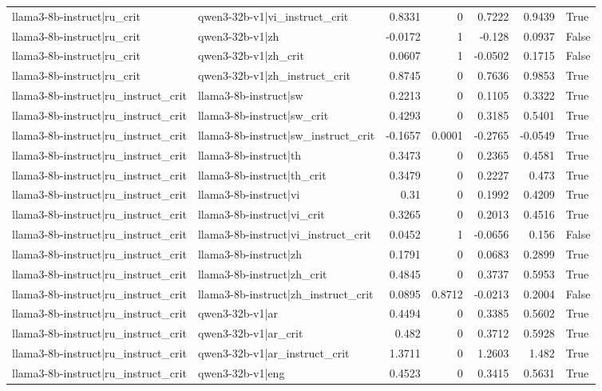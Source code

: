 \begin{table}
\begin{tabular}{l l r r r r l}
llama3-8b-instruct|ru_crit & qwen3-32b-v1|vi_instruct_crit & 0.8331 & 0 & 0.7222 & 0.9439 & True \\
llama3-8b-instruct|ru_crit & qwen3-32b-v1|zh & -0.0172 & 1 & -0.128 & 0.0937 & False \\
llama3-8b-instruct|ru_crit & qwen3-32b-v1|zh_crit & 0.0607 & 1 & -0.0502 & 0.1715 & False \\
llama3-8b-instruct|ru_crit & qwen3-32b-v1|zh_instruct_crit & 0.8745 & 0 & 0.7636 & 0.9853 & True \\
llama3-8b-instruct|ru_instruct_crit & llama3-8b-instruct|sw & 0.2213 & 0 & 0.1105 & 0.3322 & True \\
llama3-8b-instruct|ru_instruct_crit & llama3-8b-instruct|sw_crit & 0.4293 & 0 & 0.3185 & 0.5401 & True \\
llama3-8b-instruct|ru_instruct_crit & llama3-8b-instruct|sw_instruct_crit & -0.1657 & 0.0001 & -0.2765 & -0.0549 & True \\
llama3-8b-instruct|ru_instruct_crit & llama3-8b-instruct|th & 0.3473 & 0 & 0.2365 & 0.4581 & True \\
llama3-8b-instruct|ru_instruct_crit & llama3-8b-instruct|th_crit & 0.3479 & 0 & 0.2227 & 0.473 & True \\
llama3-8b-instruct|ru_instruct_crit & llama3-8b-instruct|vi & 0.31 & 0 & 0.1992 & 0.4209 & True \\
llama3-8b-instruct|ru_instruct_crit & llama3-8b-instruct|vi_crit & 0.3265 & 0 & 0.2013 & 0.4516 & True \\
llama3-8b-instruct|ru_instruct_crit & llama3-8b-instruct|vi_instruct_crit & 0.0452 & 1 & -0.0656 & 0.156 & False \\
llama3-8b-instruct|ru_instruct_crit & llama3-8b-instruct|zh & 0.1791 & 0 & 0.0683 & 0.2899 & True \\
llama3-8b-instruct|ru_instruct_crit & llama3-8b-instruct|zh_crit & 0.4845 & 0 & 0.3737 & 0.5953 & True \\
llama3-8b-instruct|ru_instruct_crit & llama3-8b-instruct|zh_instruct_crit & 0.0895 & 0.8712 & -0.0213 & 0.2004 & False \\
llama3-8b-instruct|ru_instruct_crit & qwen3-32b-v1|ar & 0.4494 & 0 & 0.3385 & 0.5602 & True \\
llama3-8b-instruct|ru_instruct_crit & qwen3-32b-v1|ar_crit & 0.482 & 0 & 0.3712 & 0.5928 & True \\
llama3-8b-instruct|ru_instruct_crit & qwen3-32b-v1|ar_instruct_crit & 1.3711 & 0 & 1.2603 & 1.482 & True \\
llama3-8b-instruct|ru_instruct_crit & qwen3-32b-v1|eng & 0.4523 & 0 & 0.3415 & 0.5631 & True \\

\end{tabular}
\end{table}
